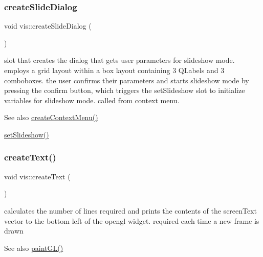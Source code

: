\subsubsection{\texorpdfstring{create\+Slide\+Dialog}{createSlideDialog}}
{\footnotesize\ttfamily void vis\+::create\+Slide\+Dialog (\begin{DoxyParamCaption}{ }\end{DoxyParamCaption})\hspace{0.3cm}{\ttfamily [slot]}}

slot that creates the dialog that gets user parameters for slideshow mode. employs a grid layout within a box layout containing 3 Q\+Labels and 3 comboboxes. the user confirms their parameters and starts slideshow mode by pressing the confirm button, which triggers the set\+Slideshow slot to initialize variables for slideshow mode. called from context menu.

\begin{DoxySeeAlso}{See also}
\mbox{\hyperlink{classvis_a63af66f730f0f06f36d255bcc7a7a244}{create\+Context\+Menu()}} 

\mbox{\hyperlink{classvis_ae8441d597e876882029ee13b16aa4cc2}{set\+Slideshow()}} 
\end{DoxySeeAlso}
\mbox{\label{classvis_a78b843a2656d5f9a9747cde2aa728f51}} 
\subsubsection{\texorpdfstring{create\+Text()}{createText()}}
{\footnotesize\ttfamily void vis\+::create\+Text (\begin{DoxyParamCaption}{ }\end{DoxyParamCaption})}

calculates the number of lines required and prints the contents of the screen\+Text vector to the bottom left of the opengl widget. required each time a new frame is drawn

\begin{DoxySeeAlso}{See also}
\mbox{\hyperlink{classvis_ace835462bb98cad495e829c08e1a26ea}{paint\+G\+L()}} 
\end{DoxySeeAlso}
\mbox{\label{classvis_aca0a94b8f2256122fc6e004a4d7de6e6}} 
